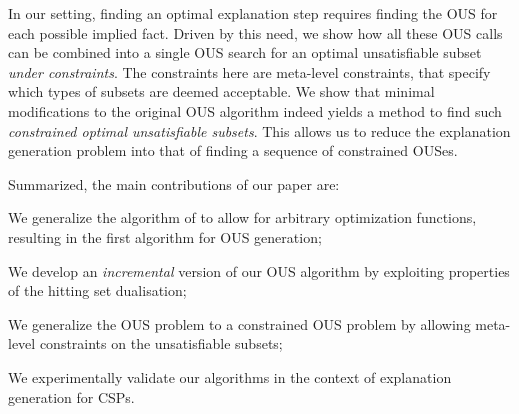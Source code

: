 In our setting, finding an optimal explanation step requires finding the OUS for each possible implied fact. Driven by this need, we show how all these OUS calls can be combined into a single OUS search for an optimal unsatisfiable subset \emph{under constraints}. The constraints here are meta-level constraints, that specify which types of subsets are deemed acceptable. 
We show that minimal modifications to the original \hitsetbased OUS algorithm indeed yields a method to find such \emph{constrained optimal unsatisfiable subsets}.
This allows us to reduce the explanation generation problem into that of finding a sequence of constrained OUSes.




Summarized, the main contributions of our paper are:
\begin{compactitem}
  \item We generalize the algorithm of \cite{ignatiev2015smallest} to allow for arbitrary  optimization functions, resulting in the first algorithm for OUS generation;
  \item We develop an \emph{incremental} version of our OUS algorithm by exploiting properties of the hitting set dualisation;
  \item We generalize the OUS problem to a constrained OUS problem by allowing meta-level constraints on the unsatisfiable subsets; %
  \item We experimentally validate our algorithms in the context of explanation generation for CSPs. %
\end{compactitem}



